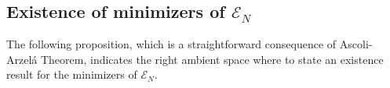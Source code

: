 %




\subsection{Existence of minimizers of $\mathcal E_N$}
The following proposition, which is a straightforward consequence of Ascoli-Arzel\'a Theorem, indicates the right ambient space where to state an existence result for the minimizers of $\mathcal E_N$.

